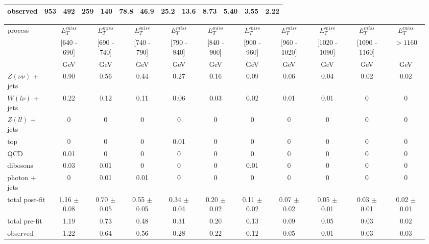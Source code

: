 \begin{landscape}
\begin{table}[p]
\begin{subtable}{}
\begin{tabular}{| l | c | c | c | c | c | c | c | c | c | c | c | c |}
\hline
\hline
  observed & 953 & 492 & 259 & 140 & 78.8 & 46.9 & 25.2 & 13.6 & 8.73 & 5.40 & 3.55 & 2.22\\
\hline
\end{tabular}
\end{subtable}
\vspace*{.7cm}
\begin{subtable}{}
\renewcommand{\arraystretch}{1.3}
\begin{tabular}{| l | c | c | c | c | c | c | c | c | c | c |}
\hline
\multirow{3}{*}{process} &  $E_T^{miss}$ &  $E_T^{miss}$ &  $E_T^{miss}$ &  $E_T^{miss}$ &  $E_T^{miss}$ &  $E_T^{miss}$ &  $E_T^{miss}$ &  $E_T^{miss}$ &  $E_T^{miss}$ &  $E_T^{miss}$  \\
 & [640 - 690] & [690 - 740] & [740 - 790] & [790 - 840] & [840 - 900] & [900 - 960] & [960 - 1020] & [1020 - 1090] & [1090 - 1160] & $> 1160$  \\
 & GeV & GeV & GeV & GeV & GeV & GeV & GeV & GeV & GeV & GeV \\
\hline
  $Z(\nu\nu)$ + jets & 0.90 & 0.56 & 0.44 & 0.27 & 0.16 & 0.09 & 0.06 & 0.04 & 0.02 & 0.02\\
  $W(l\nu)$ + jets & 0.22 & 0.12 & 0.11 & 0.06 & 0.03 & 0.02 & 0.01 & 0.01 & 0 & 0\\
  $Z(ll)$ + jets & 0 & 0 & 0 & 0 & 0 & 0 & 0 & 0 & 0 & 0\\
  top & 0 & 0 & 0 & 0.01 & 0 & 0 & 0 & 0 & 0 & 0\\
  QCD & 0.01 & 0 & 0 & 0 & 0 & 0 & 0 & 0 & 0 & 0\\
  dibosons & 0.03 & 0.01 & 0 & 0 & 0 & 0.01 & 0 & 0 & 0 & 0\\
  photon + jets  & 0 & 0.01 & 0.01 & 0 & 0 & 0 & 0 & 0 & 0 & 0\\
\hline
  total post-fit & 1.16 $\pm$ 0.08 & 0.70 $\pm$ 0.05 & 0.55 $\pm$ 0.05 & 0.34 $\pm$ 0.04 & 0.20 $\pm$ 0.02 & 0.11 $\pm$ 0.02 & 0.07 $\pm$ 0.02 & 0.05 $\pm$ 0.01 & 0.03 $\pm$ 0.01 & 0.02 $\pm$ 0.01\\
\hline
  total pre-fit  & 1.19 & 0.73 & 0.48 & 0.31 & 0.20 & 0.13 & 0.09 & 0.05 & 0.03 & 0.02\\
\hline
\hline
  observed & 1.22 & 0.64 & 0.56 & 0.28 & 0.22 & 0.12 & 0.05 & 0.01 & 0.03 & 0.03 \\
\hline
\end{tabular}
\end{subtable}
\end{table}

\end{landscape}


